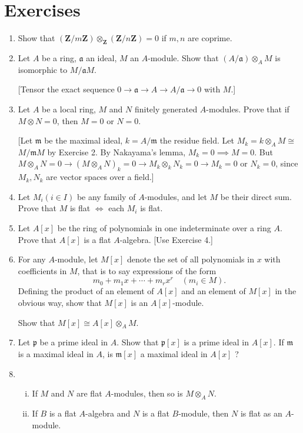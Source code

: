 \documentclass{standalone}
\theoremstyle{definition}
\theoremstyle{remark}
\begin{document}
\section{Exercises}
\begin{enumerate}[series=exc2]
  \item Show that $(\mathbf{Z} / m \mathbf{Z}) \otimes_{\mathbf{Z}}(\mathbf{Z} / n \mathbf{Z})=0$ if $m, n$ are coprime.

  \item Let $A$ be a ring, $\mathfrak{a}$ an ideal, $M$ an $A$-module. Show that
        $(A / \mathfrak{a}) \otimes_{A} M$ is isomorphic to
        $M / \mathfrak{a} M$.
        
[Tensor the exact sequence $0 \to \mathfrak{a} \to A \to A / \mathfrak{a} \to 0$
with $M$.]
  \item Let $A$ be a local ring, $M$ and $N$ finitely generated $A$-modules.
    Prove that if $M \otimes N=0$, then $M=0$ or $N=0$.
    
[Let $\mathfrak{m}$ be the maximal ideal, $k=A / \mathfrak{m}$ the residue
field. Let $M_{k}=k \otimes_{A} M \cong$ $M / \mathfrak{m} M$ by Exercise 2. By
Nakayama's lemma, $M_{k}=0 \implies M=0$. But
$M \otimes_{A} N=0 \to(M \otimes_{A} N)_{k}=0 \to M_{k} \otimes_{k} N_{k}=0 \to M_{k}=0$
or $N_{k}=0$, since $M_{k}, N_{k}$ are vector spaces over a field.]

  \item Let $M_{i}(i \in I)$ be any family of $A$-modules, and let $M$ be their
        direct sum. Prove that $M$ is flat $\Leftrightarrow$ each $M_{i}$ is
        flat.
  \item Let $A[x]$ be the ring of polynomials in one indeterminate over
    a ring $A$. Prove that $A[x]$ is a flat $A$-algebra.
    [Use Exercise 4.]
  \item For any $A$-module, let $M[x]$ denote the set of all polynomials in $x$
        with coefficients in $M$, that is to say expressions of the form
\[
  m_{0}+m_{1} x+\cdots+m_{r} x^{r} \quad(m_{i} \in M).
\]
Defining the product of an element of $A[x]$ and an element of $M[x]$ in the
obvious way, show that $M[x]$ is an $A[x]$-module.

Show that $M[x] \cong A[x] \otimes_{A} M$.
  \item Let $\mathfrak{p}$ be a prime ideal in $A$. Show that $\mathfrak{p}[x]$
        is a prime ideal in $A[x]$. If $\mathfrak{m}$ is a maximal ideal in $A$,
        is $\mathfrak{m}[x]$ a maximal ideal in $A[x]$ ?

  \item \begin{enumerate}[i)]
    \item If $M$ and $N$ are flat $A$-modules, then so is $M
      \otimes_{A} N$.
      \item If $B$ is a flat $A$-algebra and $N$ is a flat $B$-module, then $N$ is flat
        as an $A$-module.
      \end{enumerate}
      

\end{enumerate}
\end{document}
